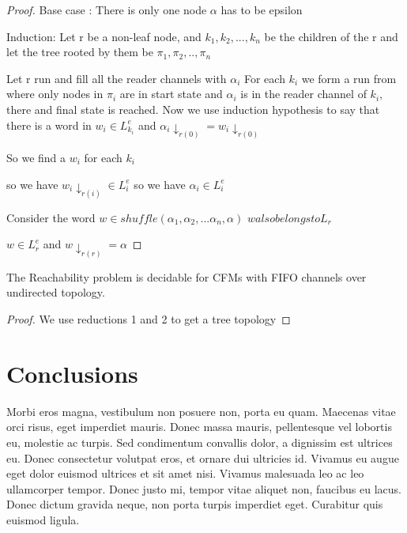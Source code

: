 \documentclass[a4paper,UKenglish,cleveref, autoref, thm-restate]{lipics-v2019}
\begin{document}
   
   \begin{proof}
    Base case : There is only one node $\alpha$ has to be epsilon 

    Induction: 
    Let r be a non-leaf node, and $k_1, k_2, ..., k_n$ be the children of the r and let the tree rooted by them be $\pi_1, \pi_2, .., \pi_n$ 
    
    Let r run and fill all the reader channels with $\alpha_i$
    For each $k_i$ we form a run from where only nodes in $\pi_i$ are in start state and $\alpha_i$ is in the reader channel of $k_i$, there and final state is reached. Now we use induction hypothesis to say that there is a word in $w_i \in L_{k_i}^e$ and $\alpha_i \downarrow_{r(0)} = w_i \downarrow_{r(0)}$
    
    So we find a $w_i$ for each $k_i$
    
    so we have $w_i \downarrow_{r(i)} \in L_i^e$ 
    so we have  $\alpha_i \in L_i^e$ 
    
    Consider the word $w \in shuffle(\alpha_1, \alpha_2,...\alpha_n, \alpha)$
    $w also belongs to L_r$
    
    $w \in L_r^e$ and $w \downarrow_{r(r)} = \alpha $ 
    
    
    
    
   \end{proof}
    

   
\begin{theorem}\label{testenv-theorem}
    The Reachability problem is decidable for CFMs with FIFO channels over undirected topology. 
   \end{theorem}

   
\begin{proof}
    We use reductions 1 and 2 to get a tree topology
    
   \end{proof}

\section{Conclusions}

Morbi eros magna, vestibulum non posuere non, porta eu quam. Maecenas vitae orci risus, eget imperdiet mauris. Donec massa mauris, pellentesque vel lobortis eu, molestie ac turpis. Sed condimentum convallis dolor, a dignissim est ultrices eu. Donec consectetur volutpat eros, et ornare dui ultricies id. Vivamus eu augue eget dolor euismod ultrices et sit amet nisi. Vivamus malesuada leo ac leo ullamcorper tempor. Donec justo mi, tempor vitae aliquet non, faucibus eu lacus. Donec dictum gravida neque, non porta turpis imperdiet eget. Curabitur quis euismod ligula. 
\end{document}
